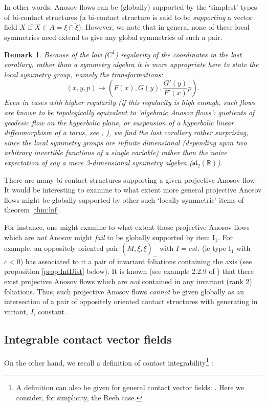 \documentclass[10pt]{amsart}
\newcommand{\R}{\mathbb{R}}
\theoremstyle{definition}
\newtheorem{rem}{Remark}
\begin{document}
In other words, Anosov flows can be (globally) supported by the `simplest' types of bi-contact structures (a bi-contact structure is said to be {\em supporting} a vector field $X$ if $X\in A = \xi\cap \tilde \xi$). However, we note that in general none of these local symmetries need extend to give any global symmetries of such a pair.

\begin{rem}\label{rem:RegAnosov}  {\em Because of the low ($C^1$) regularity of the coordinates in the last corollary, rather than a symmetry algebra it is more appropriate here to state the local symmetry group, namely the transformations: 
    \[ (x,y,p)\mapsto (F(x), G(y), \frac{G'(y)}{F'(x)}p).\]
Even in cases with higher regularity (if this regularity is high enough, such flows are known to be topologically equivalent to `algebraic Anosov flows': quotients of geodesic flow on the hyperbolic plane, or suspension of a hyperbolic linear diffeomorphism of a torus, see \cite{Ghys}, \cite{Ghys2}), we find the last corollary rather surprising, since the local symmetry groups are {\em infinite dimensional} (depending upon two arbitrary invertible functions of a single variable) rather than the naive expectation of say a mere 3-dimensional symmetry algebra ($\mathfrak{sl}_2(\R)$).}
\end{rem}

There are many bi-contact structures supporting a given projective Anosov flow. It would be interesting to examine to what extent more general projective Anosov flows might be globally supported by other such `locally symmetric' items of theorem \ref{thm:lnf}.

For instance, one might examine to what extent those projective Anosov flows which are {\em not} Anosov might {\em fail} to be globally supported by item I$_1$. For example, an oppositely oriented pair $(M, \xi, \tilde\xi)_-$ with $I = cst.$ (ie type I$_1$ with $c<0$) has associated to it a pair of invariant foliations containing the axis (see proposition \ref{prop:IntDist} below). It is known (see example 2.2.9 of \cite{ThurstEl}) that there exist projective Anosov flows which are {\em not} contained in any invariant (rank 2) foliations. Thus, such projective Anosov flows  {\em cannot} be given globally as an intersection of a pair of oppositely oriented contact structures with generating in variant, $I$, constant.


\subsection{Integrable contact vector fields}
On the other hand, we recall a definition of contact integrability\footnote{A definition can also be given for general contact vector fields: \cite{KhTabContInt}. Here we consider, for simplicity, the Reeb case.} :
\end{document}
